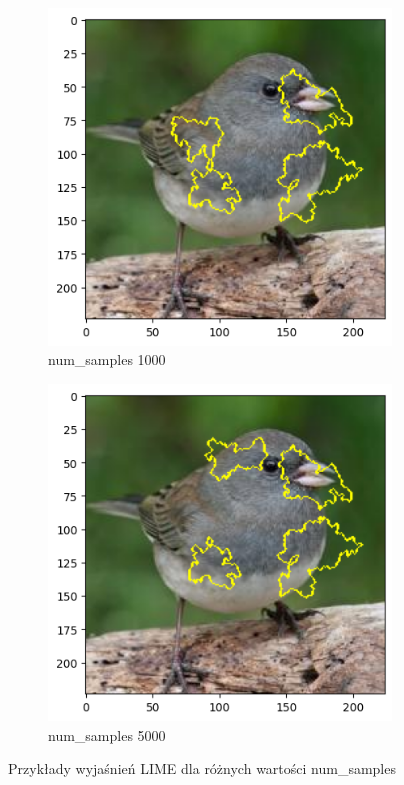 \begin{figure}[h]
\begin{subfigure}[b]{0.3\textwidth}
		\centering\includegraphics[width=.9\textwidth]{img/parameters/lime/num_samples_1000}
		\caption{num\_samples 1000}  \label{rys:parameters_lime_numsamples_1000}
	\end{subfigure}
	\begin{subfigure}[b]{0.3\textwidth}
		\centering\includegraphics[width=.9\textwidth]{img/parameters/lime/num_samples_5000}
		\caption{num\_samples 5000}  \label{rys:parameters_lime_numsamples_5000}
	\end{subfigure}
	\caption{Przykłady wyjaśnień LIME dla różnych wartości num\_samples}
\end{figure}

